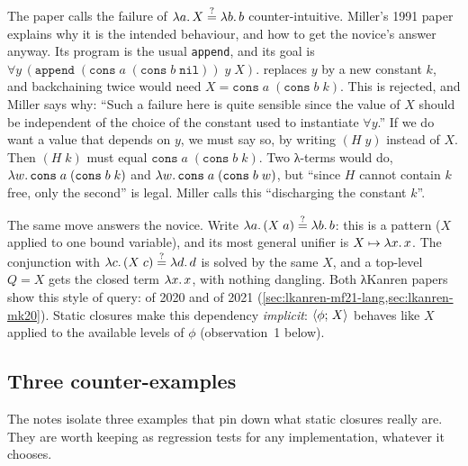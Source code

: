 \begin{tutorial}
The paper calls the failure of $\lambda a.\,X\stackrel{?}{=}\lambda b.\,b$ counter-intuitive. Miller's 1991 paper
\cite[p.\,4--5]{Miller1991} explains why it is the intended behaviour, and how to get the novice's
answer anyway. Its program is the usual \texttt{append}, and its goal is
$\forall y\,(\mathtt{append}\;(\mathtt{cons}\;a\;(\mathtt{cons}\;b\;\mathtt{nil}))\;y\;X)$.
 replaces $y$ by a new constant $k$, and backchaining twice would need
$X=\mathtt{cons}\;a\;(\mathtt{cons}\;b\;k)$. This is rejected, and Miller says why: \enquote{Such a failure
here is quite sensible since the value of $X$ should be independent of the choice of the constant used
to instantiate $\forall y$.} If we do want a value that depends on $y$, we must say so, by writing
$(H\;y)$ instead of $X$. Then $(H\;k)$ must equal $\mathtt{cons}\;a\;(\mathtt{cons}\;b\;k)$. Two λ-terms
would do, $\lambda w.\,\mathtt{cons}\;a\;(\mathtt{cons}\;b\;k)$ and
$\lambda w.\,\mathtt{cons}\;a\;(\mathtt{cons}\;b\;w)$, but \enquote{since $H$ cannot contain $k$ free, only
the second} is legal. Miller calls this \enquote{discharging the constant $k$}.

The same move answers the novice. Write $\lambda a.\,(X\;a)\stackrel{?}{=}\lambda b.\,b$: this is a pattern ($X$ applied
to one bound variable), and its most general unifier is $X\mapsto\lambda x.\,x$. The conjunction with
$\lambda c.\,(X\;c)\stackrel{?}{=}\lambda d.\,d$ is solved by the same $X$, and a top-level $Q=X$ gets the closed term
$\lambda x.\,x$, with nothing dangling. Both λKanren papers show this style of query:
 of 2020 and
 of 2021 (\cref{sec:lkanren-mf21-lang,sec:lkanren-mk20}). Static closures
make this dependency \emph{implicit}: $\langle \phi;\,X\rangle$ behaves like $X$ applied to the available
levels of $\phi$ (observation~1 below).
\end{tutorial}

\subsection{Three counter-examples}\label{sec:lkanren-counter}

The notes isolate three examples that pin down what static closures really are. They are worth
keeping as regression tests for any implementation, whatever it chooses.

